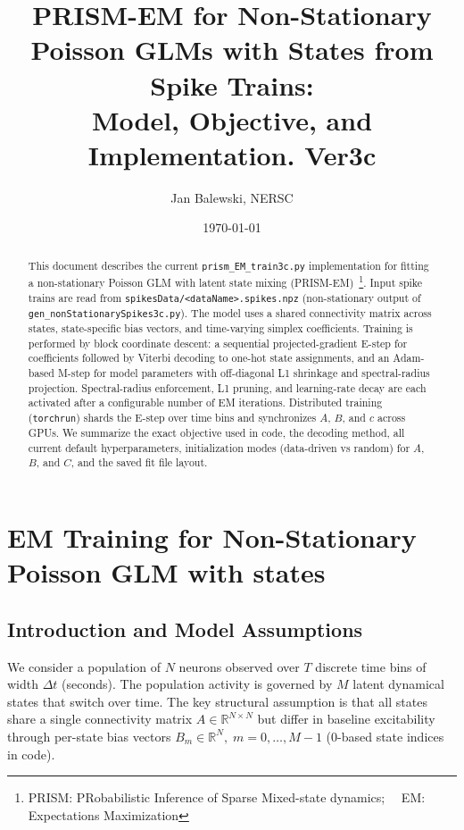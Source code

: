 \documentclass[11pt]{article}
\title{PRISM-EM for Non-Stationary Poisson GLMs with States from Spike Trains:\\
Model, Objective, and Implementation. Ver3c}
\author{Jan Balewski, NERSC}
\date{\today}
\begin{document}
\maketitle

\begin{abstract}
This document describes the current \texttt{prism\_EM\_train3c.py} implementation
for fitting a non-stationary
Poisson GLM with latent state mixing (PRISM-EM)~\footnote{PRISM: PRobabilistic Inference of Sparse Mixed-state dynamics; ~~EM: Expectations Maximization}. Input spike trains are read from \texttt{spikesData/<dataName>.spikes.npz} (non-stationary output of \texttt{gen\_nonStationarySpikes3c.py}). The model uses a shared connectivity matrix across states, state-specific bias vectors, and time-varying simplex coefficients. Training is performed by block coordinate descent: a sequential projected-gradient E-step for coefficients followed by Viterbi decoding to one-hot state assignments, and an Adam-based M-step for model parameters with off-diagonal L1 shrinkage and spectral-radius projection. Spectral-radius enforcement, L1 pruning, and learning-rate decay are each activated after a configurable number of EM iterations. Distributed training (\texttt{torchrun}) shards the E-step over time bins and synchronizes \(A\), \(B\), and \(c\) across GPUs. We summarize the exact objective used in code, the decoding method, all current default hyperparameters, initialization modes (data-driven vs random) for \(A\), \(B\), and \(C\), and the saved fit file layout.
\end{abstract}

\tableofcontents
\newpage

\section{EM Training for Non-Stationary Poisson GLM with states}
\label{sec:em}

\subsection{Introduction and Model Assumptions}

We consider a population of \(N\) neurons observed over \(T\) discrete time
bins of width \(\Delta t\) (seconds). The population activity is governed
by \(M\) latent dynamical states that switch over time. The key
structural assumption is that all states share a single
connectivity matrix \(A \in \mathbb{R}^{N \times N}\) but differ in
baseline excitability through per-state bias vectors
\(B_m \in \mathbb{R}^N,\; m = 0, \dots, M-1\) (0-based state indices in code).
\end{document}
